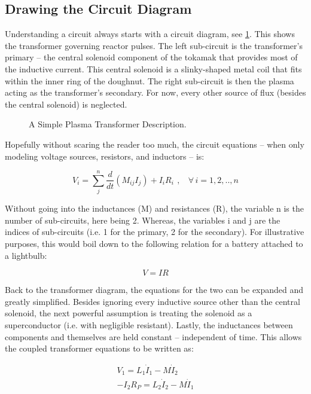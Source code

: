 \subsection{Drawing the Circuit Diagram}

Understanding a circuit always starts with a circuit diagram, see \cref{fig:circuit_diagram}. This shows the transformer governing reactor pulses. The left sub-circuit is the transformer's primary -- the central solenoid component of the tokamak that provides most of the inductive current. This central solenoid is a slinky-shaped metal coil that fits within the inner ring of the doughnut. The right sub-circuit is then the plasma acting as the transformer's secondary. For now, every other source of flux (besides the central solenoid) is neglected.

\begin{figure}[h!]
\centering

\caption{A Simple Plasma Transformer Description.}
\label{fig:circuit_diagram}
\end{figure}

Hopefully without scaring the reader too much, the circuit equations -- when only modeling voltage sources, resistors, and inductors -- is:

\begin{equation}
	V_i = \sum_j^n \frac{d}{dt} \left( M_{ij} I_j \right) + I_i R_i \ \, , \ \ \ \ \forall \, i = 1,2,..,n
\end{equation}

Without going into the inductances (M) and resistances (R), the variable n is the number of sub-circuits, here being 2. Whereas, the variables i and j are the indices of sub-circuits (i.e. 1 for the primary, 2 for the secondary). For illustrative purposes, this would boil down to the following relation for a battery attached to a lightbulb:

\begin{equation}
	V = I R
\end{equation}

Back to the transformer diagram, the equations for the two can be expanded and greatly simplified. Besides ignoring every inductive source other than the central solenoid, the next powerful assumption is treating the solenoid as a superconductor (i.e. with negligible resistant). Lastly, the inductances between components and themselves are held constant -- independent of time. This allows the coupled transformer equations to be written as:

\begin{align}
	\label{eq:circ1}
	V_1 = L_1 \dot I_1 - M \dot I_2 \\
	\label{eq:circ2}
	-I_2 R_P = L_2 \dot I_2 - M \dot I_1
\end{align}

